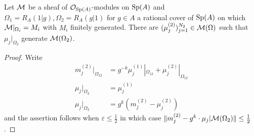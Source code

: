 \begin{corollary}\label{corr: generate restriction to Omega2}
    Let $\mathcal{M}$ be a sheaf of $\mathcal{O}_{\mathrm{Sp}(A)}$-modules on $\mathrm{Sp}(A)$ and $\Omega_{1}=R_{A}(1|g),\Omega_{2}=R_{A}(g|1)$ for $g\in A$ a rational cover of $\mathrm{Sp}(A)$ on which $\mathcal{M}|_{\Omega_{i}}=M_{i}$ with $M_{i}$ finitely generated. There are $(\mu_{j}^{(2)})_{j=1}^{N_{2}}\in\mathcal{M}(\Omega)$ such that $\mu_{j}|_{\Omega_{2}}$ generate $\mathcal{M}(\Omega_{2})$. 
\end{corollary}
\begin{proof}
    Write 
    \begin{align*}
        m_{j}^{(2)}|_{\Omega_{12}} &= g^{-k}\mu_{j}^{(1)}|_{\Omega_{12}} + \mu_{j}^{(2)}|_{\Omega_{12}} \\
        \mu_{j}|_{\Omega_{2}}&=\mu_{j}^{(1)} \\
        \mu_{j}|_{\Omega_{2}}&= g^{k}(m_{j}^{(2)}-\mu_{j}^{(2)})
    \end{align*}
    and the assertion follows when $\varepsilon\leq\frac{1}{2}$ in which case $\Vert m_{j}^{(2)} - g^{k}\cdot \mu_{j}|\mathcal{M}(\Omega_{2})\Vert\leq\frac{1}{2}$. 
\end{proof}